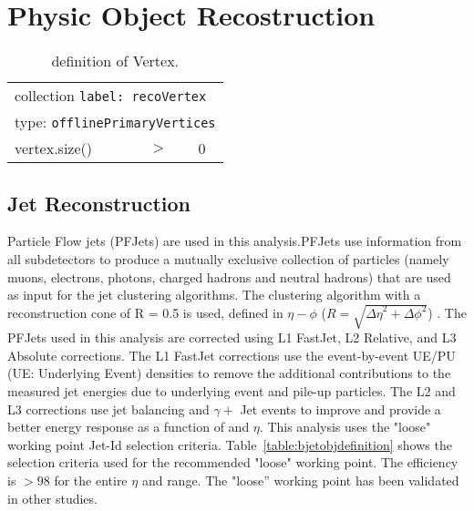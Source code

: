 \section{Physic Object Recostruction}

\begin{table}[htb]
  \caption{definition of Vertex.}
   \label{table:vertexobjdefinition}
  \ttfamily\scriptsize\selectfont
  \begin{center}
    \begin{tabular}{|l|ll|}
      \hline
      \multicolumn{3}{|l|}{collection \texttt{label: recoVertex}}\\
      \multicolumn{3}{|l|}{type: \texttt{offlinePrimaryVertices}}\\
      \hline
      vertex.size() & $>$ & 0 \\
      \hline
    \end{tabular}
  \end{center}
\end{table}

\subsection{Jet Reconstruction}

Particle Flow jets (PFJets) are used in this analysis.PFJets use information from all subdetectors to produce a mutually exclusive collection of particles (namely muons, electrons, photons, charged hadrons and neutral hadrons) that are used as input for the jet clustering algorithms. The \antikt clustering algorithm with a reconstruction cone of R = 0.5 is used, defined in $\eta-\phi$ ($R = \sqrt{{\Delta \eta}^2 + {\Delta \phi}^{2}}$) \cite{1126-6708-2008-04-063}. The PFJets used in this analysis are corrected using L1 FastJet, L2 Relative, and L3 Absolute corrections. The L1 FastJet corrections use the event-by-event UE/PU (UE: Underlying Event) densities to remove the additional contributions to the measured jet energies due to underlying event and pile-up particles. The L2 and L3 corrections use jet balancing and $\gamma+$ Jet events to improve and provide a better energy response as a function of \pt and $\eta$. This analysis uses the "loose" working point Jet-Id selection criteria. Table~\ref{table:bjetobjdefinition} shows the selection criteria used for the recommended "loose" working point. The efficiency is $> 98$ for the entire $\eta$ and \pt range. The "loose'' working point has been validated in other studies.

